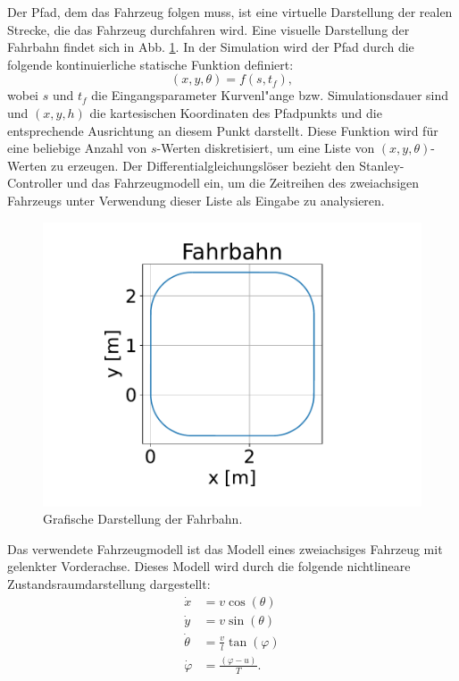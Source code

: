 \documentclass[arbeit=studie,oneside,BCOR=12mm]{ArbeitRST}
\begin{document}
Der Pfad, dem das Fahrzeug folgen muss, ist eine virtuelle Darstellung der
realen Strecke, die das Fahrzeug durchfahren wird. Eine visuelle
Darstellung der Fahrbahn findet sich in Abb. \ref{fahrbahn}. In der Simulation wird der
Pfad durch die folgende kontinuierliche statische Funktion definiert:
\begin{equation} 
  (x, y, \theta) = f(s, t_f), 
\end{equation} 
wobei $s$ und $t_f$ die Eingangsparameter Kurvenl"ange bzw. Simulationsdauer sind
und $(x, y, h)$ die kartesischen Koordinaten des Pfadpunkts und die
entsprechende Ausrichtung an diesem Punkt darstellt. Diese Funktion wird für
eine beliebige Anzahl von $s$-Werten diskretisiert, um eine Liste von $(x, y,
\theta)$-Werten zu erzeugen. Der Differentialgleichungslöser bezieht den
Stanley-Controller und das Fahrzeugmodell ein, um die Zeitreihen des
zweiachsigen Fahrzeugs unter Verwendung dieser Liste als Eingabe zu
analysieren.

\begin{figure}[h]
    \centering
    \includegraphics[scale=0.5]{Fahrbahn}
    \caption{Grafische Darstellung der Fahrbahn.}
    \label{fahrbahn}
\end{figure}


Das verwendete Fahrzeugmodell ist das Modell eines zweiachsiges Fahrzeug mit
gelenkter Vorderachse. Dieses Modell wird durch die folgende nichtlineare
Zustandsraumdarstellung dargestellt: 
\begin{subequations} \label{eq:model}
    \begin{align}
        \dot{x} &= v \cos(\theta) \\ 
        \dot{y} &= v \sin(\theta) \\ 
        \dot{\theta} &= \frac{v}{l}\tan(\varphi) \\
        \dot{\varphi} &= \frac{\left(\varphi-u\right)}{T}. 
    \end{align}
\end{subequations}
\end{document}
